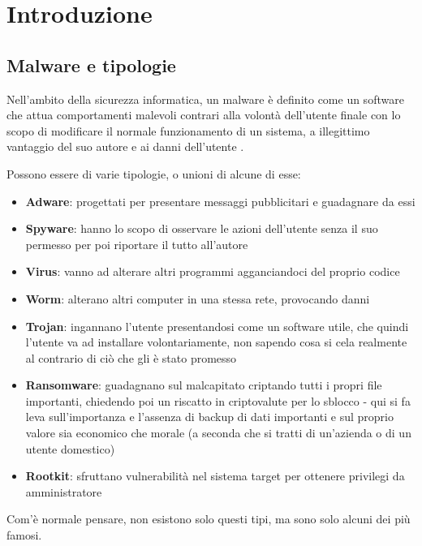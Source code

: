 \chapter{Introduzione}

\section{Malware e tipologie}
Nell'ambito della sicurezza informatica, un malware è definito come un software che attua comportamenti malevoli contrari alla volontà dell'utente finale con lo scopo di modificare il normale funzionamento di un sistema, a illegittimo vantaggio del suo autore e ai danni dell'utente \cite{malwarebytes_malware_definition}.

Possono essere di varie tipologie, o unioni di alcune di esse:
\begin{itemize}
    \item \textbf{Adware}: progettati per presentare messaggi pubblicitari e guadagnare da essi
    \item \textbf{Spyware}: hanno lo scopo di osservare le azioni dell'utente senza il suo permesso per poi riportare il tutto all'autore
    \item \textbf{Virus}: vanno ad alterare altri programmi agganciandoci del proprio codice
    \item \textbf{Worm}: alterano altri computer in una stessa rete, provocando danni
    \item \textbf{Trojan}: ingannano l'utente presentandosi come un software utile, che quindi l'utente va ad installare volontariamente, non sapendo cosa si cela realmente al contrario di ciò che gli è stato promesso
    \item \textbf{Ransomware}: guadagnano sul malcapitato criptando tutti i propri file importanti, chiedendo poi un riscatto in criptovalute per lo sblocco - qui si fa leva sull'importanza e l'assenza di backup di dati importanti e sul proprio valore sia economico che morale (a seconda che si tratti di un'azienda o di un utente domestico)
    \item \textbf{Rootkit}: sfruttano vulnerabilità nel sistema target per ottenere privilegi da amministratore
\end{itemize}
Com'è normale pensare, non esistono solo questi tipi, ma sono solo alcuni dei più famosi.

